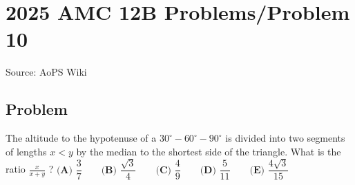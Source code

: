 \documentclass[12pt]{article}
\begin{document}
\section*{{2025 AMC 12B Problems/Problem 10}}
Source: AoPS Wiki

\subsection*{Problem}
The altitude to the hypotenuse of a $30^\circ{-}60^\circ{-}90^\circ$ is divided into two segments of lengths $x<y$ by the median to the shortest side of the triangle. What is the ratio $\tfrac{x}{x+y}$ ? $\textbf{(A) } \dfrac{3}{7} \qquad \textbf{(B) } \dfrac{\sqrt3}{4} \qquad \textbf{(C) } \dfrac{4}{9} \qquad \textbf{(D) } \dfrac{5}{11} \qquad \textbf{(E) } \dfrac{4\sqrt3}{15}$
\end{document}
